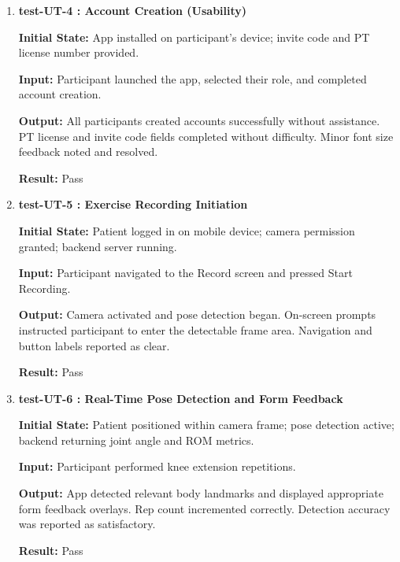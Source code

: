 \documentclass[12pt, titlepage]{article}
\begin{document}
\begin{enumerate}
\textbf{Result:} Pass

\vspace{0.5em}

\item \textbf{test-UT-4 : Account Creation (Usability)}
	
\textbf{Initial State:} App installed on participant's device; invite code and PT license number provided.

\textbf{Input:} Participant launched the app, selected their role, and completed account creation.

\textbf{Output:} All participants created accounts successfully without assistance. PT license and invite code fields completed without difficulty. Minor font size feedback noted and resolved.

\textbf{Result:} Pass

\vspace{0.5em}

\item \textbf{test-UT-5 : Exercise Recording Initiation}

\textbf{Initial State:} Patient logged in on mobile device; camera permission granted; backend server running.

\textbf{Input:} Participant navigated to the Record screen and pressed Start Recording.

\textbf{Output:} Camera activated and pose detection began. On-screen prompts instructed participant to enter the detectable frame area. Navigation and button labels reported as clear.

\textbf{Result:} Pass

\vspace{0.5em}

\item \textbf{test-UT-6 : Real-Time Pose Detection and Form Feedback}

\textbf{Initial State:} Patient positioned within camera frame; pose detection active; backend returning joint angle and ROM metrics.

\textbf{Input:} Participant performed knee extension repetitions.

\textbf{Output:} App detected relevant body landmarks and displayed appropriate form feedback overlays. Rep count incremented correctly. Detection accuracy was reported as satisfactory.

\textbf{Result:} Pass

\vspace{0.5em}


\end{enumerate}
\end{document}
